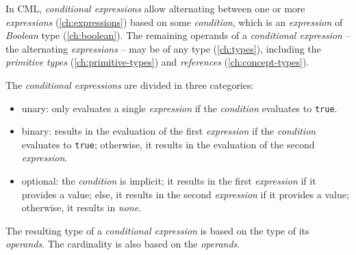 In CML, \emph{conditional expressions} allow alternating between
one or more \emph{expressions} (\ref{ch:expressions})
based on some \emph{condition},
which is an \emph{expression} of \emph{Boolean} type (\ref{ch:boolean}).
The remaining operands of a \emph{conditional expression}
-- the alternating \emph{expressions} --
may be of any type (\ref{ch:types}),
including the \emph{primitive types} (\ref{ch:primitive-types})
and \emph{references} (\ref{ch:concept-types}).

The \emph{conditional expressions} are divided in three categories:

\begin{itemize}
\item unary: only evaluates a single \emph{expression}
if the \emph{condition} evaluates to \verb!true!.
\item binary: results in the evaluation of the first \emph{expression}
if the \emph{condition} evaluates to \verb!true!;
otherwise, it results in the evaluation of the second \emph{expression}.
\item optional: the \emph{condition} is implicit;
it results in the first \emph{expression} if it provides a value;
else, it results in the second \emph{expression} if it provides a value;
otherwise, it results in \emph{none}.
\end{itemize}

The resulting type of a \emph{conditional expression}
is based on the type of its \emph{operands}.
The cardinality is also based on the \emph{operands}.

